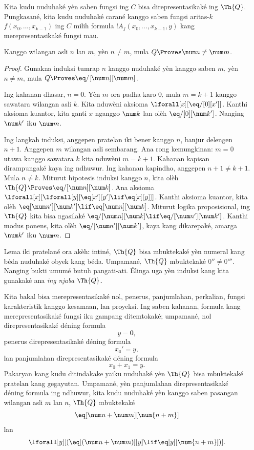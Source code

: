 \documentclass[../../../include/open-logic-section]{subfiles}
\begin{document}

Kita kudu nuduhaké yèn saben fungsi ing $C$ bisa direpresentasikaké
ing $\Th{Q}$. Pungkasané, kita kudu nuduhaké carané kanggo saben
fungsi aritas-$k$ $f(x_0,\dots,x_{k-1})$ ing $C$ milih formula
$!A_f(x_0,\dots,x_{k-1},y)$ kang merepresentasikaké fungsi mau.

\begin{lem}
Kanggo wilangan asli $n$ lan $m$, yèn $n \neq m$, mula
$Q \Proves \num n \neq \num m$.
\end{lem}

\begin{proof}
Gunakna induksi tumrap $n$ kanggo nuduhaké yèn kanggo saben $m$,
yèn $n \neq m$, mula $Q \Proves \eq/[\num n][\num m]$.

Ing kahanan dhasar, $n = 0$. Yèn $m$ ora padha karo $0$,
mula $m = k + 1$ kanggo sawatara wilangan asli $k$.
Kita nduwèni aksioma $\lforall[x][\eq/[0][x']]$.
Kanthi aksioma kuantor, kita ganti $x$ nganggo $\num k$
lan olèh $\eq/[0][\num k']$. Nanging $\num k'$ iku
$\num m$.

Ing langkah induksi, anggepen pratelan iki bener kanggo $n$,
banjur delengen $n+1$. Anggepen $m$ wilangan asli sembarang.
Ana rong kemungkinan: $m = 0$ utawa kanggo sawatara $k$
kita nduwèni $m = k+1$. Kahanan kapisan dirampungaké kaya ing ndhuwur.
Ing kahanan kapindho, anggepen $n+1 \neq k+1$.
Mula $n \neq k$. Miturut hipotesis induksi kanggo $n$,
kita olèh $\Th{Q} \Proves \eq/[\num n][\num k]$.
Ana aksioma $\lforall[x][\lforall[y][\eq[x'][y'] \lif \eq[x][y]]]$.
Kanthi aksioma kuantor, kita olèh
$\eq[\num n'][\num k'] \lif \eq[\num n][\num k]$.
Miturut logika proposisional, ing $\Th{Q}$ kita bisa ngasilaké
$\eq/[\num n][\num k] \lif \eq/[\num n'][\num k']$.
Kanthi modus ponens, kita olèh $\eq/[\num n'][\num k']$,
kaya kang dikarepaké, amarga $\num k'$ iku $\num m$.
\end{proof}

Lema iki pratelané ora akèh: intiné, $\Th{Q}$ bisa mbuktekaké
yèn numeral kang béda nuduhaké obyek kang béda. Umpamané,
$\Th{Q}$ mbuktekaké $0'' \neq 0'''$. Nanging bukti umumé
butuh pangati-ati. Élinga uga yèn induksi kang kita gunakaké
ana \emph{ing njaba} $\Th{Q}$.

Kita bakal bisa merepresentasikaké nol, penerus,
panjumlahan, perkalian, fungsi karakteristik kanggo
kesamaan, lan proyeksi. Ing saben kahanan, formula kang
merepresentasikaké fungsi iku gampang ditemtokaké;
umpamané, nol direpresentasikaké déning formula
\[
y = 0,
\]
penerus direpresentasikaké déning formula
\[
x_0' = y,
\]
lan panjumlahan direpresentasikaké déning formula
\[
x_0 + x_1 = y.
\]
Pakaryan kang kudu ditindakake yaiku nuduhaké yèn $\Th{Q}$
bisa mbuktekaké pratelan kang gegayutan. Umpamané, yèn
panjumlahan direpresentasikaké déning formula ing ndhuwur,
kita kudu nuduhaké yèn kanggo saben pasangan wilangan asli
$m$ lan $n$, $\Th{Q}$ mbuktekaké
\[
\eq[\num n + \num m][\num {n+m}]
\]
lan
\[
\lforall[y][(\eq[(\num n + \num m)][y] \lif \eq[y][\num {n+m}])].
\]
\end{document}
